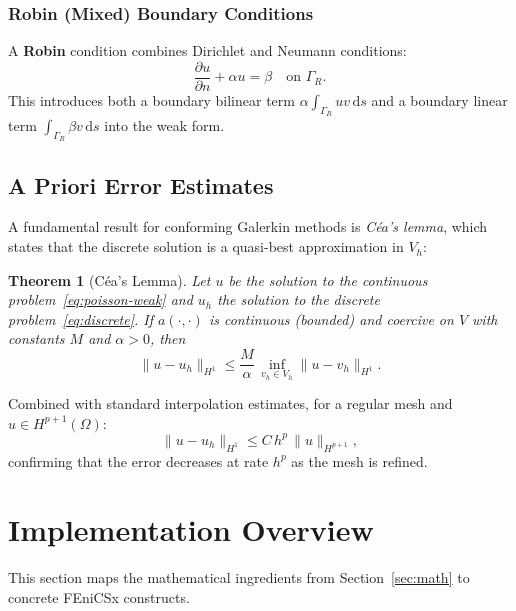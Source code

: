 \documentclass[11pt]{article}
\newtheorem{theorem}{Theorem}[section]
\newcommand{\ds}{\,\mathrm{d}s}
\newcommand{\norm}[1]{\lVert #1 \rVert}
\newcommand{\domain}{\Omega}
\begin{document}
\subsubsection{Robin (Mixed) Boundary Conditions}

A \textbf{Robin} condition combines Dirichlet and Neumann conditions:
\begin{equation*}
  \frac{\partial u}{\partial n} + \alpha u = \beta
  \quad \text{on } \Gamma_R.
\end{equation*}
This introduces both a boundary bilinear term $\alpha\int_{\Gamma_R} u v \ds$
and a boundary linear term $\int_{\Gamma_R}\beta v \ds$ into the weak form.

\subsection{A Priori Error Estimates}

A fundamental result for conforming Galerkin methods is \emph{C\'{e}a's lemma},
which states that the discrete solution is a quasi-best approximation in $V_h$:
\begin{theorem}[C\'{e}a's Lemma]
Let $u$ be the solution to the continuous problem~\eqref{eq:poisson-weak}
and $u_h$ the solution to the discrete problem~\eqref{eq:discrete}.
If $a(\cdot,\cdot)$ is continuous (bounded) and coercive on $V$ with
constants $M$ and $\alpha > 0$, then
\begin{equation*}
  \norm{u - u_h}_{H^1} \leq \frac{M}{\alpha}\,
  \inf_{v_h \in V_h} \norm{u - v_h}_{H^1}.
\end{equation*}
\end{theorem}

Combined with standard interpolation estimates, for a regular mesh and
$u \in H^{p+1}(\domain)$:
\begin{equation*}
  \norm{u - u_h}_{H^1} \leq C\, h^p\, \norm{u}_{H^{p+1}},
\end{equation*}
confirming that the error decreases at rate $h^p$ as the mesh is refined.

\section{Implementation Overview}
\label{sec:implementation}

This section maps the mathematical ingredients from Section~\ref{sec:math}
to concrete FEniCSx constructs.
\end{document}
